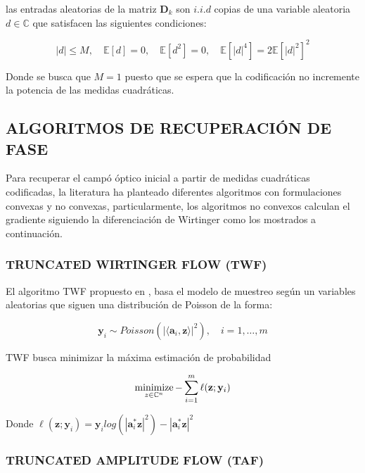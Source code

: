 las entradas aleatorias de la matriz  $\mathbf{D}_k$ son $i.i.d$ copias de una variable aleatoria $d \in \mathbb{C}$ que satisfacen las siguientes condiciones:

\begin{equation}
    \vert d \vert \leq M, \quad \mathbb{E}[d] = 0, \quad  \mathbb{E}[d^2] = 0, \quad  \mathbb{E}[\vert d \vert^4] = 2\mathbb{E}[\vert d \vert^2]^2    
    \label{eq:restricciones_mascara}
\end{equation}

Donde se busca que $M=1$ puesto que se espera que la codificación no incremente la potencia de las medidas cuadráticas.


\subsection{ALGORITMOS DE RECUPERACIÓN DE FASE}
Para recuperar el campó óptico inicial a partir de medidas cuadráticas codificadas, la literatura ha planteado diferentes algoritmos con formulaciones convexas y no convexas, particularmente, los algoritmos no convexos calculan el gradiente siguiendo la diferenciación de Wirtinger como los mostrados a continuación.

\subsubsection{TRUNCATED WIRTINGER FLOW (TWF)}

El algoritmo TWF propuesto en \cite{chen2017solving}, basa el modelo de muestreo según un variables aleatorias que siguen una distribución de Poisson de la forma:

\begin{equation}
    \mathbf{y}_i \sim Poisson( \vert \langle \mathbf{a}_i,\mathbf{z}\rangle \vert^2 ), \quad i=1,\dots,m
\end{equation}

TWF busca minimizar la máxima estimación de probabilidad 

\begin{equation}
    \operatorname*{minimize}_{z \in \mathbb{C}^{n}} - \sum_{i=1}^{m} \ell(\mathbf{z};\mathbf{y}_i)
\end{equation}

Donde $\ell(\mathbf{z};\mathbf{y}_i) = { \mathbf{y}_i log(|\mathbf{a}_i^* \mathbf{z}|^2) -|\mathbf{a}_i^* \mathbf{z}|^2 }$ 

\subsubsection{TRUNCATED AMPLITUDE FLOW (TAF)}

